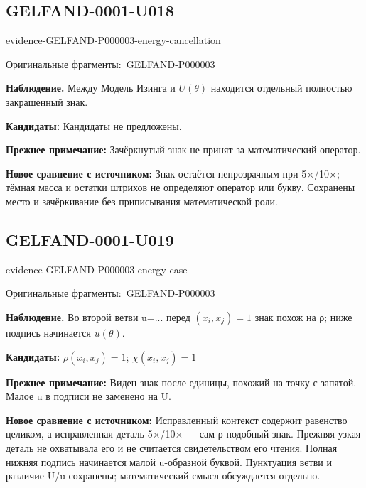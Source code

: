\documentclass[11pt]{article}
\newcommand{\EvidenceBlock}[4]{%
 \par\smallskip\noindent\begin{minipage}{\linewidth}
 \begin{minipage}[t]{.47\linewidth}\vspace{0pt}\centering
 \csname evidence-#1-#2\endcsname\par
 {\scriptsize\SourceCropCaption\ #1}\par
 \end{minipage}\hfill
 \begin{minipage}[t]{.49\linewidth}\vspace{0pt}\raggedright
 {\small\color{orange!65!black}\textbf{#4} #3}\par
 \end{minipage}
 \end{minipage}\par\smallskip}
\newcommand{\SourceCropCaption}{Оригинальные фрагменты:}\newcommand{\ReadingCaption}{Сомнительное чтение.}\newcommand{\IncompleteCaption}{Неразобранный фрагмент.}\newcommand{\DiagramCaption}{Рисунок и набранное описание.}
\begin{document}
\subsection*{GELFAND-0001-U018}
\EvidenceBlock{GELFAND-P000003}{energy-cancellation}{Между Модель Изинга и \(U(\theta)\) находится отдельный полностью закрашенный знак.}{Наблюдение.}
\par\smallskip\noindent\textbf{Кандидаты: } Кандидаты не предложены.\par
\par\smallskip\noindent\textbf{Прежнее примечание: } Зачёркнутый знак не принят за математический оператор.\par
\par\smallskip\noindent\textbf{Новое сравнение с источником: } Знак остаётся непрозрачным при 5×/10×; тёмная масса и остатки штрихов не определяют оператор или букву. Сохранены место и зачёркивание без приписывания математической роли.\par

\subsection*{GELFAND-0001-U019}
\EvidenceBlock{GELFAND-P000003}{energy-case}{Во второй ветви u=... перед \((x_i,x_j)=1\) знак похож на ρ; ниже подпись начинается \(u(\theta)\).}{Наблюдение.}
\par\smallskip\noindent\textbf{Кандидаты: } \(\rho(x_i,x_j)=1\); \(\chi(x_i,x_j)=1\)\par
\par\smallskip\noindent\textbf{Прежнее примечание: } Виден знак после единицы, похожий на точку с запятой. Малое u в подписи не заменено на U.\par
\par\smallskip\noindent\textbf{Новое сравнение с источником: } Исправленный контекст содержит равенство целиком, а исправленная деталь 5×/10× — сам ρ-подобный знак. Прежняя узкая деталь не охватывала его и не считается свидетельством его чтения. Полная нижняя подпись начинается малой u-образной буквой. Пунктуация ветви и различие U/u сохранены; математический смысл обсуждается отдельно.\par
\end{document}
